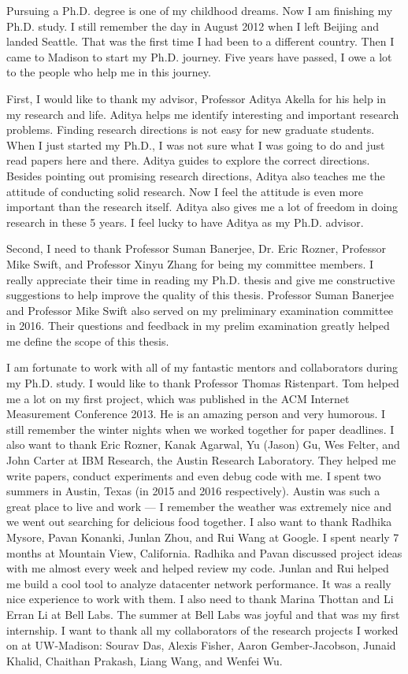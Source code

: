 

Pursuing a Ph.D. degree is one of my childhood dreams. 
Now I am finishing my Ph.D. study. I still remember the day in August 2012 when I left 
Beijing and landed Seattle. That was the first time I had been to 
a different country. Then I came to Madison to start my Ph.D. journey. 
Five years have passed, I owe a lot to the people who help me in this journey. 

First, I would like to thank my advisor, Professor Aditya Akella for 
his help in my research and life. Aditya helps me identify interesting and 
important research problems. Finding research directions is not easy for new 
graduate students. When I just started my Ph.D., I was not sure what I was going to do 
and just read papers here and there. Aditya guides to explore the correct directions. 
Besides pointing out promising research directions, Aditya also teaches me the 
attitude of conducting solid research. Now I feel the attitude is even more 
important than the research itself. Aditya also gives me a lot of freedom in doing 
research in these 5 years. I feel lucky to have Aditya as my Ph.D. advisor.

Second, I need to thank Professor Suman Banerjee, Dr. Eric Rozner, 
Professor Mike Swift, and Professor Xinyu Zhang for being my committee members. 
I really appreciate their time in reading my Ph.D. thesis and give me constructive 
suggestions to help improve the quality of this thesis. Professor Suman Banerjee 
and Professor Mike Swift also served on my preliminary examination committee in 2016. 
Their questions and feedback in my prelim examination greatly helped me 
define the scope of this thesis.

I am fortunate to work with all of my fantastic mentors and collaborators during my Ph.D. study. 
I would like to thank Professor Thomas Ristenpart. Tom helped me a lot on my first project, 
which was published in the ACM Internet Measurement Conference 2013. He is an amazing 
person and very humorous. I still remember the winter nights when we worked together for 
paper deadlines. 
I also want to thank Eric Rozner, Kanak Agarwal, Yu (Jason) Gu, Wes Felter, and 
John Carter at IBM Research, the Austin Research Laboratory. They helped me write papers, 
conduct experiments and even debug code with me. I spent two summers in Austin, Texas 
(in 2015 and 2016 respectively). Austin was such a great place to live and work --- I 
remember the weather was extremely nice and we went out searching for delicious food 
together. I also want to thank Radhika Mysore, Pavan Konanki, Junlan Zhou, and Rui Wang 
at Google. I spent nearly 7 months at Mountain View, California. Radhika and Pavan 
discussed project ideas with me almost every week and helped review my code. 
Junlan and Rui helped me build a cool tool to analyze datacenter network performance. 
It was a really nice experience to work with them. I also need to thank Marina 
Thottan and Li Erran Li at Bell Labs. The summer at Bell Labs was joyful and that 
was my first internship. I want to thank all my collaborators of the research projects 
I worked on at UW-Madison: Sourav Das, Alexis Fisher, Aaron Gember-Jacobson, 
Junaid Khalid, Chaithan Prakash, Liang Wang, and Wenfei Wu. 


